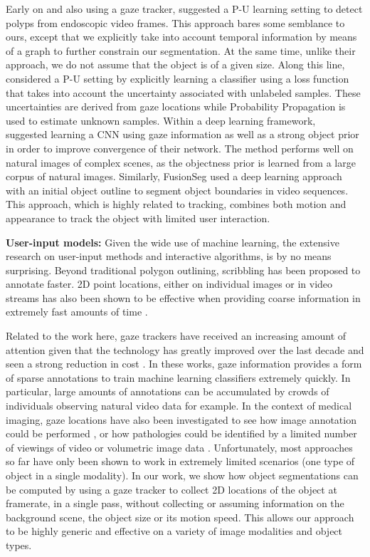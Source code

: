 Early on and also using a gaze tracker, \cite{vilarino07} suggested a P-U learning setting to detect polyps from endoscopic video frames. This approach bares some semblance to ours, except that we explicitly take into account temporal information by means of a graph to further constrain our segmentation. At the same time, unlike their approach, we do not assume that the object is of a given size. Along this line, \cite{lejeune17} considered a P-U setting by explicitly learning a classifier using a loss function that takes into account the uncertainty associated with unlabeled samples. These uncertainties are derived from gaze locations while Probability Propagation \cite{zhou04} is used to estimate unknown samples. Within a deep learning framework,~\cite{bearman16} suggested learning a CNN using gaze information as well as a strong object prior in order to improve convergence of their network. The method performs well on natural images of complex scenes, as the objectness prior is learned from a large corpus of natural images. Similarly, FusionSeg \cite{jain17} used a deep learning approach with an initial object outline to segment object boundaries in video sequences. This approach, which is highly related to tracking, combines both motion and appearance to track the object with limited user interaction.

\noindent
{\bf User-input models:} Given the wide use of machine learning, the extensive research on user-input methods and interactive algorithms, is by no means surprising. Beyond traditional polygon outlining, scribbling has been proposed to annotate faster. 2D point locations, either on individual images or in video streams has also been shown to be effective when providing coarse information in extremely fast amounts of time \cite{Papadopoulos17}.

Related to the work here, gaze trackers have received an increasing amount of attention given that the technology has greatly improved over the last decade and seen a strong reduction in cost \cite{soliman16,mettes16,bearman16}. In these works, gaze information provides a form of sparse annotations to train machine learning classifiers extremely quickly. In particular, large amounts of annotations can be accumulated by crowds of individuals observing natural video data for example. In the context of medical imaging, gaze locations have also been investigated to see how image annotation could be performed \cite{sadegh09}, or how pathologies could be identified by a limited number of viewings of video or volumetric image data \cite{vilarino07,khosravan16}. Unfortunately, most approaches so far have only been shown to work in extremely limited scenarios (\eg one type of object in a single modality). In our work, we show how object segmentations can be computed by using a gaze tracker to collect 2D locations of the object at framerate, in a single pass, without collecting or assuming information on the background scene, the object size or its motion speed. This allows our approach to be highly generic and effective on a variety of image modalities and object types.


